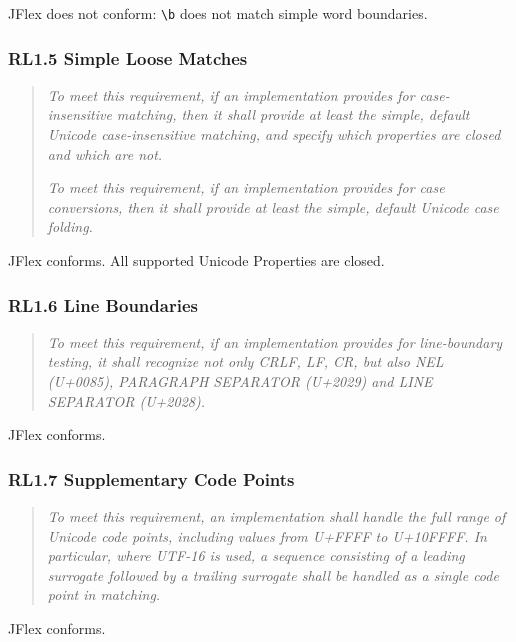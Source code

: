 JFlex does not conform: \texttt{\textbackslash{}b} does not match simple
word boundaries.

\subsubsection{RL1.5 Simple Loose
Matches}\label{rl1.5-simple-loose-matches}

\begin{quote}
\emph{To meet this requirement, if an implementation provides for
case-insensitive matching, then it shall provide at least the simple,
default Unicode case-insensitive matching, and specify which properties
are closed and which are not.}

\emph{To meet this requirement, if an implementation provides for case
conversions, then it shall provide at least the simple, default Unicode
case folding.}
\end{quote}

JFlex conforms. All supported Unicode Properties are closed.

\subsubsection{RL1.6 Line Boundaries}\label{rl1.6-line-boundaries}

\begin{quote}
\emph{To meet this requirement, if an implementation provides for
line-boundary testing, it shall recognize not only CRLF, LF, CR, but
also NEL (U+0085), PARAGRAPH SEPARATOR (U+2029) and LINE SEPARATOR
(U+2028).}
\end{quote}

JFlex conforms.

\subsubsection{RL1.7 Supplementary Code
Points}\label{rl1.7-supplementary-code-points}

\begin{quote}
\emph{To meet this requirement, an implementation shall handle the full
range of Unicode code points, including values from U+FFFF to U+10FFFF.
In particular, where UTF-16 is used, a sequence consisting of a leading
surrogate followed by a trailing surrogate shall be handled as a single
code point in matching.}
\end{quote}

JFlex conforms.


